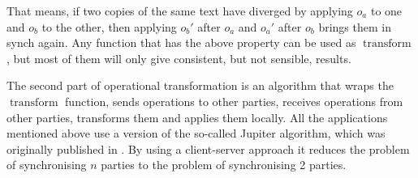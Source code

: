 \documentclass[a4paper,final,12pt,oneside,article,table]{memoir}
\DeclareMathOperator{\transform}{transform}
\begin{document}
That means, if two copies of the same text have diverged by applying
$o_a$ to one and $o_b$ to the other, then applying $o_b'$ after $o_a$
and $o_a'$ after $o_b$ brings them in synch again. Any function that has
the above property can be used as $\transform$, but most of them will
only give consistent, but not sensible, results.

The second part of operational transformation is an algorithm that
wraps the $\transform$ function, sends operations to other parties,
receives operations from other parties, transforms them and applies them
locally.  All the applications mentioned above use a version of the
so-called Jupiter algorithm, which was originally published in
\cite{Jupiter}. By using a client-server approach it reduces the problem
of synchronising $n$ parties to the problem of synchronising 2 parties.
\end{document}
